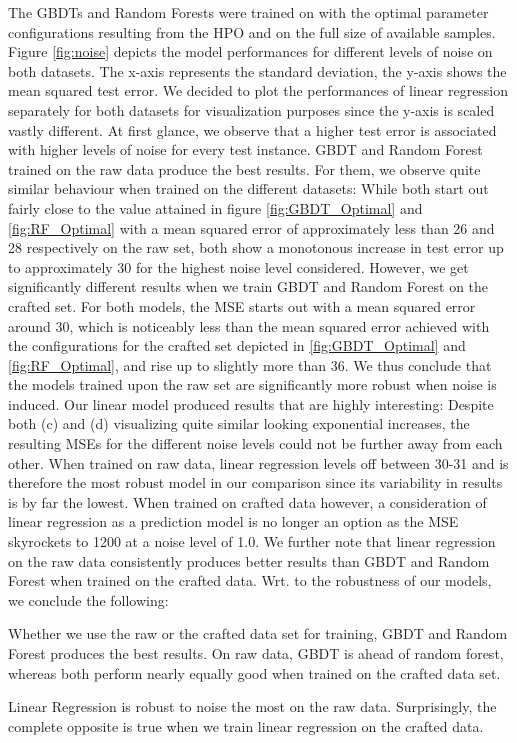 The GBDTs and Random Forests were trained on with the optimal parameter configurations resulting from the HPO and on the full size of available samples. Figure \ref{fig:noise} depicts the model performances for different levels of noise on both datasets. The x-axis represents the standard deviation, the y-axis shows the mean squared test error. We decided to plot the performances of linear regression separately for both datasets for visualization purposes since the y-axis is scaled vastly different. At first glance, we observe that a higher test error is associated with higher levels of noise for every test instance. GBDT and Random Forest trained on the raw data produce the best results. For them, we observe quite similar behaviour when trained on the different datasets: While both start out fairly close to the value attained in figure \ref{fig:GBDT_Optimal} and \ref{fig:RF_Optimal} with a mean squared error of approximately less than 26 and 28 respectively on the raw set, both show a monotonous increase in test error up to approximately 30 for the highest noise level considered. However, we get significantly different results when we train GBDT and Random Forest on the crafted set. For both models, the MSE starts out with a mean squared error around 30, which is noticeably less than the mean squared error achieved with the configurations for the crafted set depicted in \ref{fig:GBDT_Optimal} and \ref{fig:RF_Optimal}, and rise up to slightly more than 36. We thus conclude that the models trained upon the raw set are significantly more robust when noise is induced. Our linear model produced results that are highly interesting: Despite both (c) and (d) visualizing quite similar looking exponential increases, the resulting MSEs for the different noise levels could not be further away from each other. When trained on raw data, linear regression levels off between 30-31 and is therefore the most robust model in our comparison since its variability in results is by far the lowest. When trained on crafted data however, a consideration of linear regression as a prediction model is no longer an option as the MSE skyrockets to 1200 at a noise level of 1.0. We further note that linear regression on the raw data consistently produces better results than GBDT and Random Forest when trained on the crafted data. 
Wrt. to the robustness of our models, we conclude the following:
\begin{description}[font=$\bullet$\scshape\bfseries]
	\item Whether we use the raw or the crafted data set for training, GBDT and Random Forest produces the best results. On raw data, GBDT is ahead of random forest, whereas both perform nearly equally good when trained on the crafted data set. 
	\item Linear Regression is robust to noise the most on the raw data. Surprisingly, the complete opposite is true when we train linear regression on the crafted data. 
\end{description}
